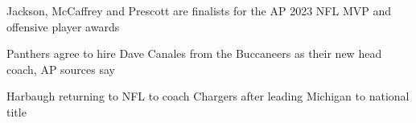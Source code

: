 Jackson, McCaffrey and Prescott are finalists for the AP 2023 NFL MVP and offensive player awards

\noindent Panthers agree to hire Dave Canales from the Buccaneers as their new head coach, AP sources say

\noindent Harbaugh returning to NFL to coach Chargers after leading Michigan to national title